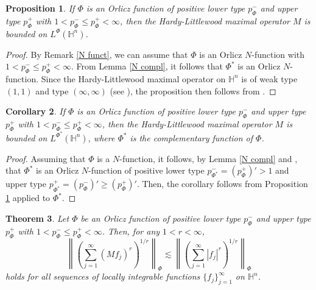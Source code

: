 \documentclass[oneside,10pt]{article}
\newtheorem{theorem}{Theorem}
\newtheorem{corollary}[theorem]{Corollary}
\newtheorem{proposition}[theorem]{Proposition}
\begin{document}
\begin{proposition} \label{M bound 1}
If $\Phi$ is an Orlicz function of positive lower type $p_{\Phi}^{-}$ and upper type $p_{\Phi}^{+}$ with 
$1 < p_{\Phi}^{-} \leq p_{\Phi}^{+} < \infty$, then the Hardy-Littlewood maximal operator $M$ is bounded on $L^{\Phi}(\mathbb{H}^n)$.
\end{proposition}

\begin{proof}
By Remark \ref{N funct}, we can assume that $\Phi$ is an Orlicz $N$-function with $1 < p_{\Phi}^{-} \leq p_{\Phi}^{+} < \infty$. From Lemma 
\ref{N compl}, it follows that $\Phi^{*}$ is an Orlicz $N$-function. Since the Hardy-Littlewood maximal operator on $\mathbb{H}^n$ is 
of weak type $(1, 1)$ and type $(\infty, \infty)$ (see \cite[{\bf 2.5} and Theorem 1 in Chapter I]{Elias}), the proposition then follows 
from \cite[Theorem 2.2]{Gallardo}.
\end{proof}

\begin{corollary} \label{M bound 2}
If $\Phi$ is an Orlicz function of positive lower type $p_{\Phi}^{-}$ and upper type $p_{\Phi}^{+}$ with 
$1 < p_{\Phi}^{-} \leq p_{\Phi}^{+} < \infty$, then the Hardy-Littlewood maximal operator $M$ is bounded on $L^{\Phi^{*}}(\mathbb{H}^n)$, where $\Phi^{*}$ is the complementary function of $\Phi$.
\end{corollary}

\begin{proof}
Assuming that $\Phi$ is a $N$-function, it follows, by Lemma \ref{N compl} and \cite[Proposition 7.8]{sawa}, that $\Phi^{*}$ is 
an Orlicz $N$-function of positive lower type $p_{\Phi^{*}}^{-} = (p_{\Phi}^{+})' > 1$ and upper type 
$p_{\Phi^{*}}^{+} = (p_{\Phi}^{-})' \geq (p_{\Phi}^{+})'$. Then, the corollary follows from Proposition \ref{M bound 1} applied 
to $\Phi^{*}$.  
\end{proof}

\begin{theorem} \label{Feff-Stein max ineq}
Let $\Phi$ be an Orlicz function of positive lower type $p_{\Phi}^{-}$ and upper type $p_{\Phi}^{+}$ with 
$1 < p_{\Phi}^{-} \leq p_{\Phi}^{+} < \infty$. Then, for any $1 < r < \infty$,
\begin{equation} \label{vector ineq M}
\left\| \left( \sum_{j=1}^{\infty} (M f_j)^r  \right)^{1/r}  \right\|_{\Phi} \lesssim 
\left\| \left( \sum_{j=1}^{\infty} |f_j|^r  \right)^{1/r}  \right\|_{\Phi}
\end{equation}
holds for all sequences of locally integrable functions $\{ f_j \}_{j=1}^{\infty}$ on $\mathbb{H}^n$.
\end{theorem}
 
\end{document}

